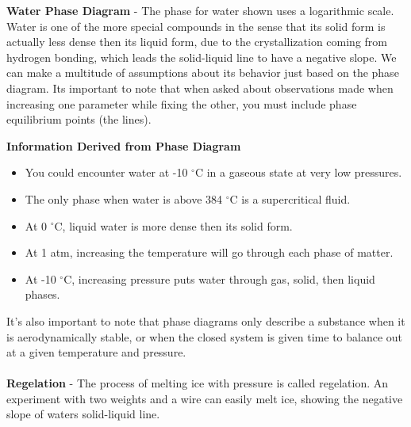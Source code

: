 \documentclass{article}
\begin{document}
\begin{minipage}{0.47\textwidth}
	
\end{minipage}
	\begin{minipage}{0.605\textwidth}
		
	\textbf{Water Phase Diagram} - The phase for water shown uses a logarithmic scale. Water is one of the more special compounds in the sense that its solid form is actually less dense then its liquid form, due to the crystallization coming from hydrogen bonding, which leads the solid-liquid line to have a negative slope. We can make a multitude of assumptions about its behavior just based on the phase diagram. Its important to note that when asked about observations made when increasing one parameter while fixing the other, you must include phase equilibrium points (the lines).
	
	\end{minipage}
	
	\begin{qq}
		
		\textbf{Information Derived from Phase Diagram}
		\begin{itemize}[leftmargin=*]
		\item You could encounter water at -10 $^{\circ}$C in a gaseous state at very low pressures.
		\item The only phase when water is above 384 $^{\circ}$C is a supercritical fluid.
		\item At 0 $^{\circ}$C, liquid water is more dense then its solid form.
		\item At 1 atm, increasing the temperature will go through each phase of matter.
		\item At -10 $^{\circ}$C, increasing pressure puts water through gas, solid, then liquid phases. 
	\end{itemize}

	
	\end{qq}
	
	\vspace{5pt}
	\noindent It's also important to note that phase diagrams only describe a substance when it is aerodynamically stable, or when the closed system is given time to balance out at a given temperature and pressure.\\
	\\
	\textbf{Regelation} - The process of melting ice with pressure is called regelation. An experiment with two weights and a wire can easily melt ice, showing the negative slope of waters solid-liquid line.
\end{document}
